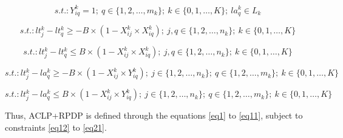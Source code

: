 \documentclass[preprint]{elsarticle}
\begin{document}
\begin{equation} \label{eq17}
	s.t.:  Y_{iq}^k = 1; \ q \in \{1, 2, \ldots, m_k\}; \ k \in \{0, 1, \ldots, K\};  \ la^k_q \in L_k
\end{equation}

\begin{equation} \label{eq18}
	s.t.: lt_j^k - lt_q^k \geq -B \times (1-X_{ij}^k \times X_{iq}^k); \ j,q \in \{1, 2, \ldots, n_k\}; \ k \in \{0, 1, \ldots, K\}
\end{equation}

\begin{equation} \label{eq19}
	s.t.: lt_j^k - lt_q^k \leq B\times (1-X_{ij}^k \times X_{iq}^k); \ j,q \in \{1, 2, \ldots, n_k\}; \ k \in \{0, 1, \ldots, K\}
\end{equation}

\begin{equation} \label{eq20}
	s.t.: lt_j^k - la_q^k \geq -B \times (1-X_{ij}^k \times Y_{iq}^k); \ j \in \{1, 2, \ldots, n_k\}; \ q \in \{1, 2, \ldots, m_k\}; \ k \in \{0, 1, \ldots, K\}
\end{equation}

\begin{equation} \label{eq21}
	s.t.: lt_j^k - la_q^k \leq B\times (1-X_{ij}^k \times Y_{iq}^k); \ j \in \{1, 2, \ldots, n_k\}; \ q \in \{1, 2, \ldots, m_k\}; \ k \in \{0, 1, \ldots, K\}
\end{equation}


Thus, ACLP+RPDP is defined through the equations \ref{eq1} to \ref{eq11}, subject to constraints \ref{eq12} to \ref{eq21}.
\end{document}
